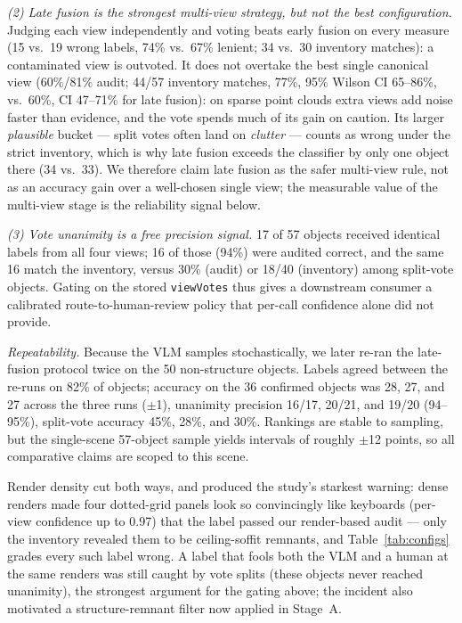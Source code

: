\documentclass[conference]{IEEEtran}
\begin{document}
\emph{(2) Late fusion is the strongest multi-view strategy, but not the
best configuration.} Judging each view independently and voting beats
early fusion on every measure (15 vs.\ 19 wrong labels, 74\% vs.\ 67\%
lenient; 34 vs.\ 30 inventory matches): a contaminated view is outvoted.
It does not overtake the best single canonical view (60\%/81\% audit;
44/57 inventory matches, 77\%, 95\% Wilson CI 65--86\%, vs.\ 60\%, CI
47--71\% for late fusion): on sparse point clouds extra views add noise
faster than evidence, and the vote spends much of its gain on caution.
Its larger \emph{plausible} bucket --- split votes often land on
\emph{clutter} --- counts as wrong under the strict inventory, which is
why late fusion exceeds the classifier by only one object there (34 vs.\
33). We therefore claim late fusion as the safer multi-view rule, not as
an accuracy gain over a well-chosen single view; the measurable value of
the multi-view stage is the reliability signal below.

\emph{(3) Vote unanimity is a free precision signal.} 17 of 57 objects
received identical labels from all four views; 16 of those (94\%) were
audited correct, and the same 16 match the inventory, versus 30\% (audit)
or 18/40 (inventory) among split-vote objects. Gating on the stored
\texttt{viewVotes} thus gives a downstream consumer a calibrated
route-to-human-review policy that per-call confidence alone did not
provide.

\emph{Repeatability.} Because the VLM samples stochastically, we later
re-ran the late-fusion protocol twice on the 50 non-structure objects.
Labels agreed between the re-runs on 82\% of objects; accuracy on the 36
confirmed objects was 28, 27, and 27 across the three runs ($\pm$1),
unanimity precision 16/17, 20/21, and 19/20 (94--95\%), split-vote
accuracy 45\%, 28\%, and 30\%. Rankings are stable to sampling, but the
single-scene 57-object sample yields intervals of roughly $\pm$12 points,
so all comparative claims are scoped to this scene.

Render density cut both ways, and produced the study's starkest warning:
dense renders made four dotted-grid panels look so convincingly like
keyboards (per-view confidence up to 0.97) that the label passed our
render-based audit --- only the inventory revealed them to be
ceiling-soffit remnants, and Table~\ref{tab:configs} grades every such
label wrong. A label that fools both the VLM and a human at the same
renders was still caught by vote splits (these objects never reached
unanimity), the strongest argument for the gating above; the incident
also motivated a structure-remnant filter now applied in Stage~A.
\end{document}
